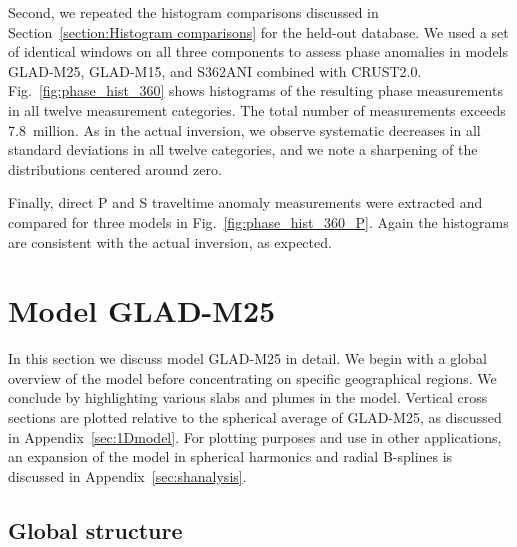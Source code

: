 \documentclass[extra,mreferee]{gji}
\begin{document}
Second, we repeated the histogram comparisons discussed in
Section~\ref{section:Histogram comparisons} for the held-out database.
We used a set of identical windows on all three components to assess
phase anomalies in models GLAD-M25, GLAD-M15, and S362ANI combined with CRUST2.0.
Fig.~\ref{fig:phase_hist_360} shows histograms of the resulting phase
measurements in all twelve measurement categories.
The total number of measurements exceeds 7.8~million.
As in the actual inversion,
we observe systematic decreases in all standard deviations in all twelve categories,
and we note a sharpening of the distributions centered around zero.

Finally,
direct P and S traveltime anomaly measurements were extracted and compared for three models in Fig.~\ref{fig:phase_hist_360_P}.
Again the histograms are consistent with the actual inversion,
as expected.


\section{Model GLAD-M25}
\label{section:model}

In this section we discuss model GLAD-M25 in detail.
We begin with a global overview of the model before concentrating on
specific geographical regions.
We conclude by highlighting various slabs and plumes in the model.
Vertical cross sections are plotted relative to the spherical average of GLAD-M25,
as discussed in Appendix~\ref{sec:1Dmodel}.
For plotting purposes and use in other applications,
an expansion of the model in spherical harmonics and radial B-splines is
discussed in Appendix~\ref{sec:shanalysis}.

\subsection{Global structure}
\end{document}
